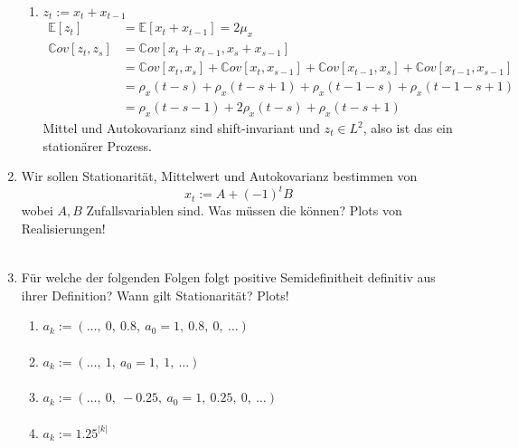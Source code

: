 \documentclass[a4paper,11pt,notitlepage,fullpage]{article}
\newcommand{\Ee}[1]{\mathbb E\left[#1\right]}
\newcommand{\Cov}[1]{\mathbb Cov\left[#1\right]}
\begin{document}
\begin{enumerate}
\begin{enumerate}
\item $z_t := x_t + x_{t-1}$
\begin{align*}
\Ee{z_t} &= \Ee{ x_t + x_{t-1}} = 2\mu_x\\
\Cov{z_t, z_s} &= \Cov{x_t + x_{t-1}, x_s + x_{s-1}} \\
&= \Cov{x_t , x_s} + \Cov{x_t ,x_{s-1}} + \Cov{x_{t-1}, x_s} + \Cov{x_{t-1},x_{s-1}}\\
&= \rho_x(t-s) + \rho_x(t-s+1) + \rho_x(t-1-s) + \rho_x(t-1-s+1)\\
&= \rho_x(t-s-1) + 2\rho_x(t-s) + \rho_x(t-s+1)
\end{align*}
Mittel und Autokovarianz sind shift-invariant und $z_t\in L^2$, also ist das ein stationärer Prozess.
\end{enumerate}

\item Wir sollen Stationarität, Mittelwert und Autokovarianz bestimmen von
$$x_t := A + (-1)^t B$$
wobei $A, B$ Zufallsvariablen sind. Was müssen die können? Plots von Realisierungen!

\begin{align*}
\end{align*}


\item Für welche der folgenden Folgen folgt positive Semidefinitheit definitiv aus ihrer Definition? Wann gilt Stationarität? Plots!
\begin{enumerate}
\item $a_k := (\ldots, ~0, ~0.8, ~a_0=1, ~0.8, ~0, ~\ldots)$
\begin{align*}
\end{align*}

\item $a_k := (\ldots, ~1, ~a_0=1,  ~1, ~\ldots)$
\begin{align*}
\end{align*}

\item $a_k := (\ldots, ~0, ~-0.25, ~a_0=1, ~0.25, ~0, ~\ldots)$
\begin{align*}
\end{align*}

\item $a_k := 1.25^{|k|}$
\begin{align*}
\end{align*}
\end{enumerate}


\end{enumerate}
\end{document}
